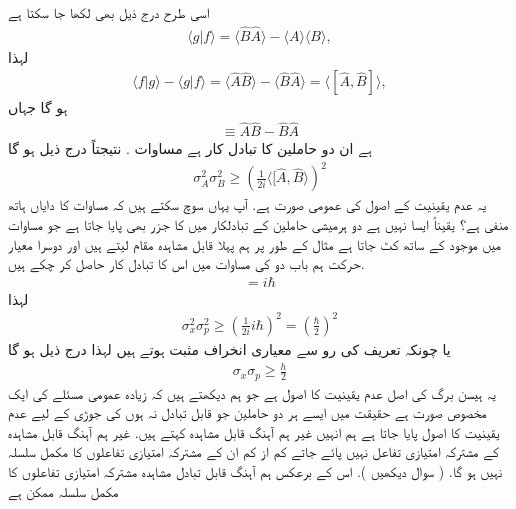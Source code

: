 اسی طرح درج ذیل بھی لکھا جا سکتا ہے 
\begin{align*}
\langle g|f \rangle = \langle \hat{B}\hat{A} \rangle - \langle A \rangle \langle B \rangle ,
\end{align*}
لہذا \begin{align*}
\langle f|g \rangle - \langle g|f \rangle = \langle \hat{A}\hat{B} \rangle -\langle \hat{B}\hat{A} \rangle = \langle [ \hat{A} , \hat{B}] \rangle ,
\end{align*}
ہو گا
جہاں
\begin{align*}
[\hat{A} , \hat{B}] \equiv \hat{A} \hat{B} - \hat{B}\hat{A}
\end{align*}
ہے
ان دو حاملین کا تبادل کار ہے مساوات  . نتیجتاً درج ذیل ہو گا 
\begin{align}
\sigma_{A}^{2} \sigma_{B}^{2} \geq \left(\frac{1}{2i} \langle [\hat{A} , \hat{B} \rangle \right)^{2}
\end{align}
یہ عدم یقینیت کے اصول کی عمومی صورت ہے. آپ یہاں سوچ سکتے ہیں کہ مساوات کا دایاں ہاتھ منفی ہے؟ یقیناً ایسا نہیں ہے دو ہرمیشی حاملین کے تبادلکار میں  کا جزر بھی پایا جاتا ہے جو مساوات میں موجود  کے ساتھ کٹ جاتا ہے
مثال کے طور پر ہم پہلا قابل مشاہدہ مقام  لیتے ہیں اور دوسرا معیار حرکت  ہم باب دو کی مساوات   میں اس کا تبادل کار حاصل کر چکے ہیں.
\begin{align*}
[ \hat{x} . \hat{p} ] = i \hbar
\end{align*}
لہذا
\begin{align*}
\sigma_{x}^{2} \sigma_{p}^{2} \geq \left( \frac{1}{2i} i \hbar \right)^{2} = \left( \frac{\hbar}{2} \right)^{2}
\end{align*}
یا چونکہ تعریف کی رو سے معیاری انخراف مثبت ہوتے ہیں لہذا درج ذیل ہو گا
\begin{align}
\sigma_{x} \sigma_{p} \geq \frac{h}{2}
\end{align}
یہ ہیسن برگ کی اصل عدم یقینیت کا اصول ہے جو ہم دیکھتے ہیں کہ زیادہ عمومی مسئلے کی ایک مخصوص صورت ہے
حقیقت میں ایسے ہر دو حاملین جو قابل تبادل نہ ہوں کی جوڑی کے لیے عدم یقینیت کا اصول پایا جاتا ہے ہم انہیں غیر ہم آہنگ قابل مشاہدہ کہتے ہیں. غیر ہم آہنگ قابل مشاہدہ کے مشترکہ امتیازی تفاعل نہیں پائے جاتے کم از کم ان کے مشترکہ امتیازی تفاعلوں کا مکمل 
سلسلہ نہیں ہو گا. ( سوال   دیکھیں ). اس کے برعکس ہم آہنگ قابل تبادل مشاہدہ مشترکہ امتیازی تفاعلوں کا مکمل سلسلہ ممکن ہے
